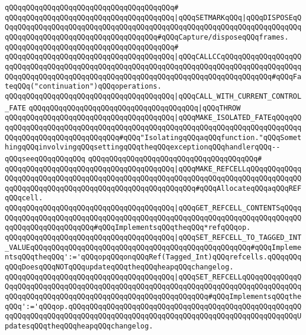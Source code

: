 \verb|qQQqqQQqqQQqqQQqqQQqqQQqqQQqqQQqqQQqqQQq#|\newline
\verb|qQQqqQQqqQQqqQQqqQQqqQQqqQQqqQQqqQQqqQQq|\verb#|qQQqSETMARKqQQq|qQQqDISPOSEqQQqqQQqqQQqqQQqqQQqqQQqqQQqqQQqqQQqqQQqqQQqqQQqqQQqqQQqqQQqqQQqqQQqqQQqqQQqqQQqqQQqqQQqqQQqqQQqqQQqqQQqqQQq#\verb|#qQQqCapture/disposeqQQqframes.|\newline
\verb|qQQqqQQqqQQqqQQqqQQqqQQqqQQqqQQqqQQqqQQq#|\newline
\verb|qQQqqQQqqQQqqQQqqQQqqQQqqQQqqQQqqQQqqQQq|\verb#|qQQqCALLCCqQQqqQQqqQQqqQQqqQQqqQQqqQQqqQQqqQQqqQQqqQQqqQQqqQQqqQQqqQQqqQQqqQQqqQQqqQQqqQQqqQQqqQQqqQQqqQQqqQQqqQQqqQQqqQQqqQQqqQQqqQQqqQQqqQQqqQQqqQQqqQQqqQQqqQQq#\verb|#qQQqFateqQQq("continuation")qQQqoperations.|\newline
\verb|qQQqqQQqqQQqqQQqqQQqqQQqqQQqqQQqqQQqqQQq|\verb#|qQQqCALL_WITH_CURRENT_CONTROL_FATE#\newline
\verb|qQQqqQQqqQQqqQQqqQQqqQQqqQQqqQQqqQQqqQQq|\verb#|qQQqTHROW#\newline
\verb|qQQqqQQqqQQqqQQqqQQqqQQqqQQqqQQqqQQqqQQq|\verb#|qQQqMAKE_ISOLATED_FATEqQQqqQQqqQQqqQQqqQQqqQQqqQQqqQQqqQQqqQQqqQQqqQQqqQQqqQQqqQQqqQQqqQQqqQQqqQQqqQQqqQQqqQQqqQQqqQQqqQQqqQQq#\verb|#qQQq"IsolatingqQQqaqQQqfunction."qQQqSomethingqQQqinvolvingqQQqsettingqQQqtheqQQqexceptionqQQqhandlerqQQq--qQQqseeqQQqqQQqqQQq|\newline
\verb|qQQqqQQqqQQqqQQqqQQqqQQqqQQqqQQqqQQqqQQq#|\newline
\verb|qQQqqQQqqQQqqQQqqQQqqQQqqQQqqQQqqQQqqQQq|\verb#|qQQqMAKE_REFCELLqQQqqQQqqQQqqQQqqQQqqQQqqQQqqQQqqQQqqQQqqQQqqQQqqQQqqQQqqQQqqQQqqQQqqQQqqQQqqQQqqQQqqQQqqQQqqQQqqQQqqQQqqQQqqQQqqQQqqQQqqQQqqQQq#\verb|#qQQqAllocateqQQqaqQQqREFqQQqcell.|\newline
\verb|qQQqqQQqqQQqqQQqqQQqqQQqqQQqqQQqqQQqqQQq|\verb#|qQQqGET_REFCELL_CONTENTSqQQqqQQqqQQqqQQqqQQqqQQqqQQqqQQqqQQqqQQqqQQqqQQqqQQqqQQqqQQqqQQqqQQqqQQqqQQqqQQqqQQqqQQqqQQqqQQq#\verb|#qQQqImplementsqQQqtheqQQq*refqQQqop.|\newline
\verb|qQQqqQQqqQQqqQQqqQQqqQQqqQQqqQQqqQQqqQQq|\verb#|qQQqSET_REFCELL_TO_TAGGED_INT_VALUEqQQqqQQqqQQqqQQqqQQqqQQqqQQqqQQqqQQqqQQqqQQqqQQqqQQq#\verb|#qQQqImplementsqQQqtheqQQq':='qQQqopqQQqonqQQqRef(Tagged_Int)qQQqrefcells.qQQqqQQqqQQqDoesqQQqNOTqQQqupdateqQQqtheqQQqheapqQQqchangelog.|\newline
\verb|qQQqqQQqqQQqqQQqqQQqqQQqqQQqqQQqqQQqqQQq|\verb#|qQQqSET_REFCELLqQQqqQQqqQQqqQQqqQQqqQQqqQQqqQQqqQQqqQQqqQQqqQQqqQQqqQQqqQQqqQQqqQQqqQQqqQQqqQQqqQQqqQQqqQQqqQQqqQQqqQQqqQQqqQQqqQQqqQQqqQQqqQQqqQQq#\verb|#qQQqImplementsqQQqtheqQQq':='qQQqop.qQQqqQQqqQQqqQQqqQQqqQQqqQQqqQQqqQQqqQQqqQQqqQQqqQQqqQQqqQQqqQQqqQQqqQQqqQQqqQQqqQQqqQQqqQQqqQQqqQQqqQQqqQQqqQQqqQQqqQQqqQQqUpdatesqQQqtheqQQqheapqQQqchangelog.|\newline
